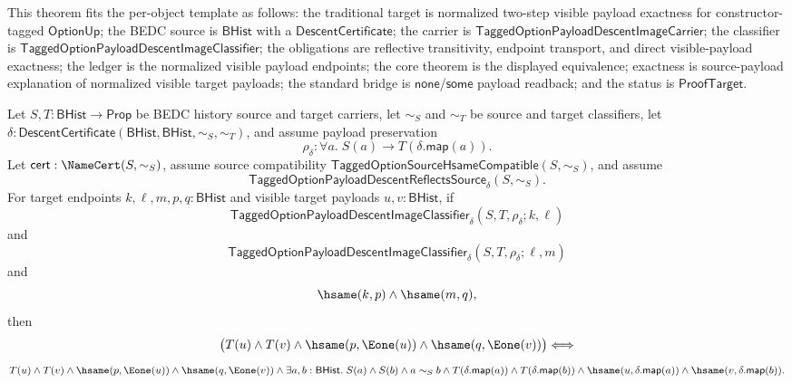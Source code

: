 \begin{theorem}
\label{thm:tagged-option-payload-descent-image-classifier-reflective-transitive-normalized-visible-payload-exactness}
This theorem fits the per-object template as follows: the traditional target is
normalized two-step visible payload exactness for constructor-tagged
$\mathsf{OptionUp}$; the BEDC source is $\mathsf{BHist}$ with a
$\mathsf{DescentCertificate}$; the carrier is
$\mathsf{TaggedOptionPayloadDescentImageCarrier}$; the classifier is
$\mathsf{TaggedOptionPayloadDescentImageClassifier}$; the obligations are
reflective transitivity, endpoint transport, and direct visible-payload
exactness; the ledger is the normalized visible payload endpoints; the core
theorem is the displayed equivalence; exactness is source-payload explanation of
normalized visible target payloads; the standard bridge is $\mathsf{none}$/$\mathsf{some}$
payload readback; and the status is $\mathsf{ProofTarget}$.

Let $S,T:\mathsf{BHist}\to\mathsf{Prop}$ be BEDC history source and target
carriers, let $\sim_S$ and $\sim_T$ be source and target classifiers, let
$\delta:\mathsf{DescentCertificate}(\mathsf{BHist},\mathsf{BHist},\sim_S,\sim_T)$,
and assume payload preservation
$$
\rho_{\delta}:\forall a.\;S(a)\to T(\delta.\mathsf{map}(a)).
$$
Let $\mathsf{cert}:\NameCert(S,\sim_S)$, assume source compatibility
$\mathsf{TaggedOptionSourceHsameCompatible}(S,\sim_S)$, and assume
$$
\mathsf{TaggedOptionPayloadDescentReflectsSource}_{\delta}(S,\sim_S).
$$
For target endpoints $k,\ell,m,p,q:\mathsf{BHist}$ and visible target payloads
$u,v:\mathsf{BHist}$, if
$$
\mathsf{TaggedOptionPayloadDescentImageClassifier}_{\delta}
(S,T,\rho_{\delta};k,\ell)
$$
and
$$
\mathsf{TaggedOptionPayloadDescentImageClassifier}_{\delta}
(S,T,\rho_{\delta};\ell,m)
$$
and
$$
\hsame(k,p)\land \hsame(m,q),
$$
then
$$
\bigl(
T(u)\land T(v)\land
\hsame(p,\Eone(u))\land \hsame(q,\Eone(v))
\bigr)
\Longleftrightarrow
$$
$$
T(u)\land T(v)\land
\hsame(p,\Eone(u))\land \hsame(q,\Eone(v))\land
\exists a,b:\mathsf{BHist}.\;
S(a)\land S(b)\land a\sim_S b\land
T(\delta.\mathsf{map}(a))\land T(\delta.\mathsf{map}(b))\land
\hsame(u,\delta.\mathsf{map}(a))\land
\hsame(v,\delta.\mathsf{map}(b)).
$$
\end{theorem}
